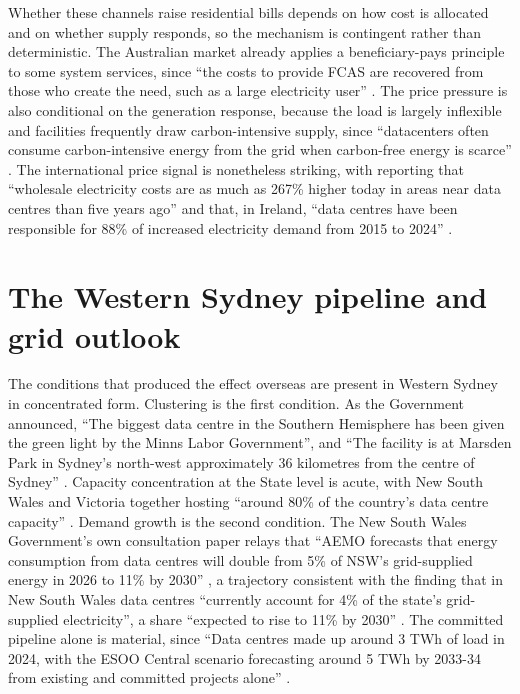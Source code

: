 Whether these channels raise residential bills depends on how cost is allocated and on whether supply responds, so the mechanism is contingent rather than deterministic. The Australian market already applies a beneficiary-pays principle to some system services, since \enquote{the costs to provide FCAS are recovered from those who create the need, such as a large electricity user} \autocite{ecaDataCentresEnergyLandscape2025}. The price pressure is also conditional on the generation response, because the load is largely inflexible and facilities frequently draw carbon-intensive supply, since \enquote{datacenters often consume carbon-intensive energy from the grid when carbon-free energy is scarce} \autocite{acunCarbonExplorerHolistic2023}. The international price signal is nonetheless striking, with reporting that \enquote{wholesale electricity costs are as much as 267\% higher today in areas near data centres than five years ago} and that, in Ireland, \enquote{data centres have been responsible for 88\% of increased electricity demand from 2015 to 2024} \autocite{ecaDataCentresEnergyLandscape2025}.

\section{The Western Sydney pipeline and grid outlook}
\label{sec:supp:gen:wsydney}

The conditions that produced the effect overseas are present in Western Sydney in concentrated form. Clustering is the first condition. As the Government announced, \enquote{The biggest data centre in the Southern Hemisphere has been given the green light by the Minns Labor Government}, and \enquote{The facility is at Marsden Park in Sydney's north-west approximately 36 kilometres from the centre of Sydney} \autocite{nswMarsdenParkDataCentre2025}. Capacity concentration at the State level is acute, with New South Wales and Victoria together hosting \enquote{around 80\% of the country's data centre capacity} \autocite{usscPoweringCloud2025}. Demand growth is the second condition. The New South Wales Government's own consultation paper relays that \enquote{AEMO forecasts that energy consumption from data centres will double from 5\% of NSW's grid-supplied energy in 2026 to 11\% by 2030} \autocite{inswDataCentreConsultation2026}, a trajectory consistent with the finding that in New South Wales data centres \enquote{currently account for 4\% of the state's grid-supplied electricity}, a share \enquote{expected to rise to 11\% by 2030} \autocite{usscPoweringCloud2025}. The committed pipeline alone is material, since \enquote{Data centres made up around 3 TWh of load in 2024, with the ESOO Central scenario forecasting around 5 TWh by 2033-34 from existing and committed projects alone} \autocite{ecaConsumerImpactsDataCentres2025}.

